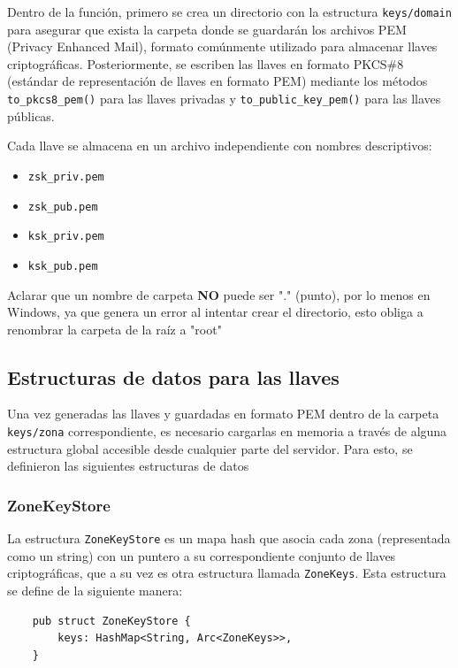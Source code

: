 Dentro de la función, primero se crea un directorio con la estructura \texttt{keys/{domain}} para asegurar que exista la carpeta donde se guardarán los archivos PEM (Privacy Enhanced Mail), formato
comúnmente utilizado para almacenar llaves criptográficas. Posteriormente, se escriben las llaves en formato PKCS\#8 (estándar de representación de llaves en formato PEM) mediante los 
métodos \texttt{to\_pkcs8\_pem()} para las llaves privadas y \texttt{to\_public\_key\_pem()} para las llaves públicas.

Cada llave se almacena en un archivo independiente con nombres descriptivos:
\begin{itemize}
\item \texttt{zsk\_priv.pem}
\item \texttt{zsk\_pub.pem}
\item \texttt{ksk\_priv.pem}
\item \texttt{ksk\_pub.pem}
\end{itemize}

Aclarar que un nombre de carpeta \textbf{NO} puede ser "." (punto), por lo menos en Windows, ya que genera un error al intentar crear el directorio, 
esto obliga a renombrar la carpeta de la raíz a "root"

\subsection{Estructuras de datos para las llaves}

Una vez generadas las llaves y guardadas en formato PEM dentro de la carpeta \texttt{keys/zona} correspondiente, es necesario cargarlas en memoria
a través de alguna estructura global accesible desde cualquier parte del servidor. Para esto, se definieron las siguientes estructuras de datos

\subsubsection{ZoneKeyStore}

La estructura \texttt{ZoneKeyStore} es un mapa hash que asocia cada zona (representada como un string) con un puntero a su correspondiente conjunto de llaves criptográficas, que a su vez es otra
estructura llamada \texttt{ZoneKeys}. Esta estructura se define de la siguiente manera:

\begin{lstlisting}
    pub struct ZoneKeyStore {
        keys: HashMap<String, Arc<ZoneKeys>>,
    }
\end{lstlisting}


